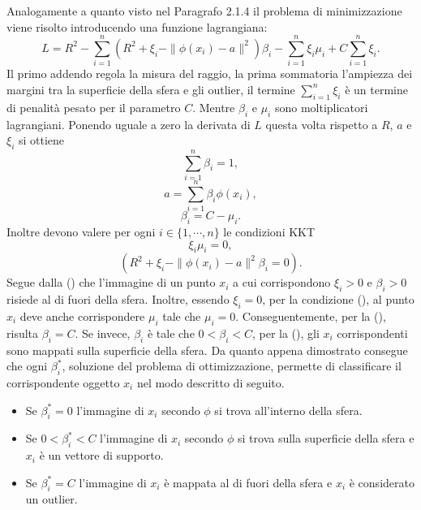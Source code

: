 \documentclass [11pt,a4paper,twoside,openright] {book}
\begin{document}
\noindent
Analogamente a quanto visto nel Paragrafo 2.1.4 il problema di minimizzazione viene risolto introducendo una funzione lagrangiana:
\begin{equation}
L = R^2 - \sum_{i=1}^n (R^2 + \xi_i - \parallel \phi(x_i) - a \parallel^2) \beta_i - \sum_{i=1}^n \xi_i \mu_i + C \sum_{i=1}^n \xi_i.
\end{equation}
Il primo addendo regola la misura del raggio, la prima sommatoria l'ampiezza dei margini tra la superficie della sfera e gli outlier, il termine $\sum_{i=1}^n\xi_i$ è un termine di penalità pesato per il parametro $C$. Mentre $\beta_i$ e $\mu_i$ sono moltiplicatori lagrangiani. Ponendo uguale a zero la derivata di $L$ questa volta rispetto a $R$, $a$ e $\xi_i$ si ottiene
\begin{equation}\label{beta}
\sum_{i=1}^n \beta_i = 1,
\end{equation}
\begin{equation}\label{centro}
a = \sum_{i=1}^n \beta_i \phi(x_i),
\end{equation}
\begin{equation}\label{C}
\beta_i = C - \mu_i.
\end{equation}
Inoltre devono valere per ogni $i \in \lbrace 1, \cdots, n \rbrace$ le condizioni KKT
\begin{equation}\label{kkt1}
\xi_i\mu_i = 0,
\end{equation}
\begin{equation}\label{kkt2}
(R^2 + \xi_i - \parallel \phi(x_i)-a \parallel^2 \beta_i = 0).
\end{equation}
Segue dalla () che l'immagine di un punto $x_i$ a cui corrispondono $\xi_i > 0$ e $\beta_i > 0$ risiede al di fuori della sfera. Inoltre, essendo $\xi_i = 0$, per la condizione (), al punto $x_i$ deve anche corrispondere $\mu_i$ tale che $\mu_i = 0$. Conseguentemente, per la (), risulta $\beta_i = C$. Se invece, $\beta_i$ è tale che $0 < \beta_i < C$, per la (), gli $x_i$ corrispondenti sono mappati sulla superficie della sfera. Da quanto appena dimostrato consegue che ogni $\beta_i^*$, soluzione del problema di ottimizzazione, permette di classificare il corrispondente oggetto $x_i$ nel modo descritto di seguito.
\begin{itemize}
\item Se $\beta_i^*=0$ l'immagine di $x_i$ secondo $\phi$ si trova all'interno della sfera.
\item Se $0 < \beta_i^* < C$ l'immagine di $x_i$ secondo $\phi$ si trova sulla superficie della sfera e $x_i$ è un vettore di supporto.
\item Se $\beta_i^*=C$ l'immagine di $x_i$ è mappata al di fuori della sfera e $x_i$ è considerato un outlier.
\end{itemize}
\end{document}
